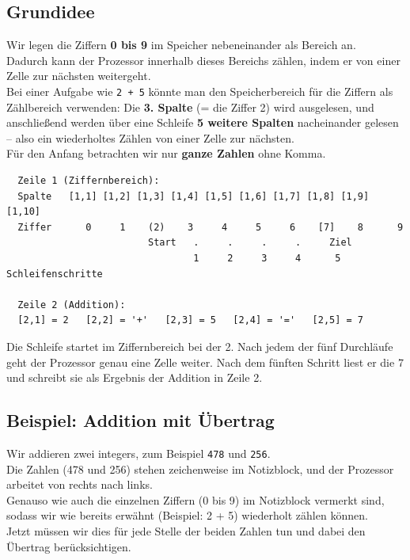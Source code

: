 \documentclass{article}
\begin{document}
          \subsection{Grundidee}

        
  Wir legen die Ziffern \textbf{0 bis 9} im Speicher nebeneinander als Bereich an.\\
            Dadurch kann der Prozessor innerhalb dieses Bereichs zählen, indem er von einer Zelle zur nächsten weitergeht.\\
            Bei einer Aufgabe wie \texttt{2 + 5} könnte man den Speicherbereich für die Ziffern als Zählbereich verwenden: Die \textbf{3. Spalte} (= die Ziffer 2) wird ausgelesen, und anschließend werden über eine Schleife \textbf{5 weitere Spalten} nacheinander gelesen – also ein wiederholtes Zählen von einer Zelle zur nächsten.\\
            Für den Anfang betrachten wir nur \textbf{ganze Zahlen} ohne Komma.

\begin{verbatim}
  Zeile 1 (Ziffernbereich):
  Spalte   [1,1] [1,2] [1,3] [1,4] [1,5] [1,6] [1,7] [1,8] [1,9] [1,10]
  Ziffer      0     1    (2)    3     4     5     6    [7]    8      9
                         Start   .     .     .     .     Ziel
                                 1     2     3     4      5   Schleifenschritte

  Zeile 2 (Addition):
  [2,1] = 2   [2,2] = '+'   [2,3] = 5   [2,4] = '='   [2,5] = 7
\end{verbatim}

Die Schleife startet im Ziffernbereich bei der 2. Nach jedem der fünf Durchläufe geht der Prozessor genau eine Zelle weiter. Nach dem fünften Schritt liest er die 7 und schreibt sie als Ergebnis der Addition in Zeile 2.


          \subsection{Beispiel: Addition mit Übertrag}

        
  Wir addieren zwei integers, zum Beispiel \texttt{478} und \texttt{256}.\\
            Die Zahlen (478 und 256) stehen zeichenweise im Notizblock, und der Prozessor arbeitet von rechts nach links. \\
            Genauso wie auch die einzelnen Ziffern (0 bis 9) im Notizblock vermerkt sind, sodass wir wie bereits erwähnt (Beispiel: 2 + 5) wiederholt zählen können. \\
            Jetzt müssen wir dies für jede Stelle der beiden Zahlen tun und dabei den Übertrag berücksichtigen.\\
\end{document}
